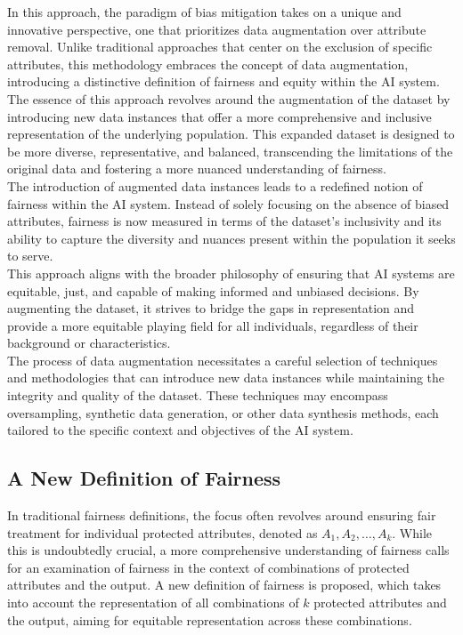 \documentclass[12pt,a4paper,openright,twoside]{book}
\begin{document}
In this approach, the paradigm of bias mitigation takes on a unique and innovative perspective, one that prioritizes data augmentation over attribute removal. Unlike traditional approaches that center on the exclusion of specific attributes, this methodology embraces the concept of data augmentation, introducing a distinctive definition of fairness and equity within the AI system.\\
The essence of this approach revolves around the augmentation of the dataset by introducing new data instances that offer a more comprehensive and inclusive representation of the underlying population. This expanded dataset is designed to be more diverse, representative, and balanced, transcending the limitations of the original data and fostering a more nuanced understanding of fairness. \\
The introduction of augmented data instances leads to a redefined notion of fairness within the AI system. Instead of solely focusing on the absence of biased attributes, fairness is now measured in terms of the dataset's inclusivity and its ability to capture the diversity and nuances present within the population it seeks to serve. \\
This approach aligns with the broader philosophy of ensuring that AI systems are equitable, just, and capable of making informed and unbiased decisions. By augmenting the dataset, it strives to bridge the gaps in representation and provide a more equitable playing field for all individuals, regardless of their background or characteristics. \\
The process of data augmentation necessitates a careful selection of techniques and methodologies that can introduce new data instances while maintaining the integrity and quality of the dataset. These techniques may encompass oversampling, synthetic data generation, or other data synthesis methods, each tailored to the specific context and objectives of the AI system.

\subsection{A New Definition of Fairness}

In traditional fairness definitions, the focus often revolves around ensuring fair treatment for individual protected attributes, denoted as $A_1, A_2, \ldots, A_k$. While this is undoubtedly crucial, a more comprehensive understanding of fairness calls for an examination of fairness in the context of combinations of protected attributes and the output. A new definition of fairness is proposed, which takes into account the representation of all combinations of $k$ protected attributes and the output, aiming for equitable representation across these combinations.
\end{document}
